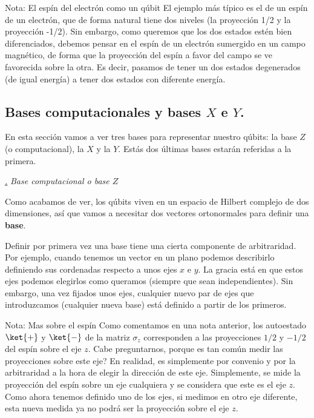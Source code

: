 \documentclass[a4paper,11pt]{book} %
\numberwithin{equation}{chapter}
\def\subsubiContadorIt{\par\addtocounter{subsubsection}{1}\underline{\it\thesubsubsection.}\hskip0.5cm \setcounter{subsubsubsectionIt}{0}}
\newcommand{\SubsubiIt}[1]{
		\subsubiContadorIt \textit{#1}
	}
\newcounter{subsubsubsectionIt}[subsubsection]
\begin{document}
\begin{mybox_blue}{Nota: El espín del electrón como un qúbit}
El ejemplo más típico es el de un espín de un electrón, que de forma natural tiene dos niveles (la proyección 1/2 y la proyección -1/2). Sin embargo, como queremos que los dos estados estén bien diferenciados, debemos pensar en el espín de un electrón sumergido en un campo magnético, de forma que la proyección del espín a favor del campo se ve favorecida sobre la otra. Es decir, pasamos de tener un dos estados degenerados (de igual energía) a tener dos estados con diferente energía. 
\end{mybox_blue}


	

	  	\subsection{Bases computacionales y bases $X$ e $Y$.}
	  	
En esta sección vamos a ver tres bases para representar nuestro qúbits: la base $Z$ (o computacional), la $X$ y la $Y$. Estás dos últimas bases estarán referidas a la primera.  
	  	
			\SubsubiIt{Base computacional o base $Z$} 
    	
Como acabamos de ver, los qúbits viven en un espacio de Hilbert complejo de dos dimensiones, así que vamos a necesitar dos vectores ortonormales para definir una \textbf{base}. 
    	
Definir por primera vez una base tiene una cierta componente de arbitraridad. Por ejemplo, cuando tenemos un vector en un plano podemos describirlo definiendo sus cordenadas respecto a unos ejes $x$ e $y$. La gracia está en que estos ejes podemos elegirlos como queramos (siempre que sean independientes). Sin embargo, una vez fijados unos ejes, cualquier nuevo par de ejes que introduzcamos (cualquier nueva base) está definido a partir de los primeros.


	\begin{mybox_blue}{Nota: Mas sobre el espín}
	Como comentamos en una nota anterior, los autoestado  $\ket{+}$ y $\ket{-}$ de la matriz $\sigma_z$ 
	corresponden a las proyecciones $1/2$ y $-1/2$ del espín sobre el eje $z$. Cabe preguntarnos, porque 
	es tan común medir las proyecciones sobre este eje? En realidad, es simplemente por convenio y 
	por la arbitraridad a la hora de elegir la dirección de este eje. Simplemente, se mide la 
	proyección del espín sobre un eje cualquiera y se considera que este es el eje $z$. Como ahora 
	tenemos definido uno de los ejes, si medimos en otro eje diferente, esta nueva medida  ya no podrá 
	ser la proyección sobre el eje $z$. 
	\end{mybox_blue}
\end{document}
